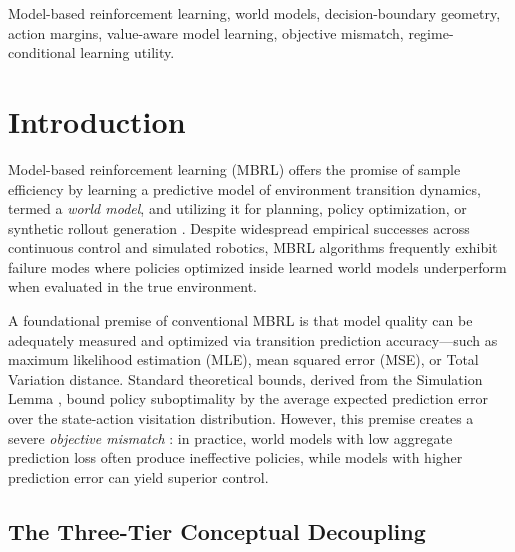 \documentclass[journal,10pt,twocolumn]{IEEEtran}
\begin{document}
\begin{IEEEkeywords}
Model-based reinforcement learning, world models, decision-boundary geometry, action margins, value-aware model learning, objective mismatch, regime-conditional learning utility.
\end{IEEEkeywords}

\section{Introduction}
\label{sec:introduction}

Model-based reinforcement learning (MBRL) offers the promise of sample efficiency by learning a predictive model of environment transition dynamics, termed a \emph{world model}, and utilizing it for planning, policy optimization, or synthetic rollout generation \cite{sutton1990integrated, luo2018algorithmic, janner2019trust}.
Despite widespread empirical successes across continuous control and simulated robotics, MBRL algorithms frequently exhibit failure modes where policies optimized inside learned world models underperform when evaluated in the true environment.

A foundational premise of conventional MBRL is that model quality can be adequately measured and optimized via transition prediction accuracy---such as maximum likelihood estimation (MLE), mean squared error (MSE), or Total Variation distance. 
Standard theoretical bounds, derived from the Simulation Lemma \cite{kakade2002approximately, luo2018algorithmic, yu2020mopo, pires2016policy}, bound policy suboptimality by the average expected prediction error over the state-action visitation distribution. 
However, this premise creates a severe \emph{objective mismatch} \cite{farahmand2017value, lambert2020objective, wei2023unified}: in practice, world models with low aggregate prediction loss often produce ineffective policies, while models with higher prediction error can yield superior control.

\subsection{The Three-Tier Conceptual Decoupling}
\label{subsec:three_tier_framework}
\end{document}

